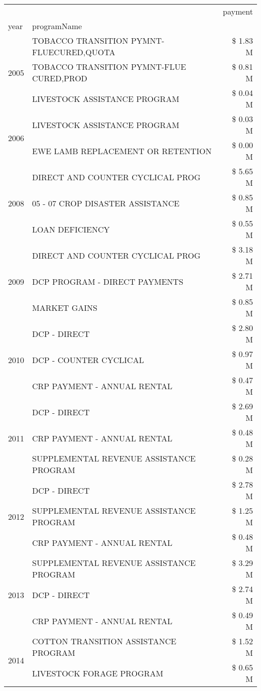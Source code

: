 \begin{tabular}{llr}
\toprule
 &  & payment \\
year & programName &  \\
\midrule
\multirow[t]{3}{*}{2005} & TOBACCO TRANSITION PYMNT-FLUECURED,QUOTA & \$ 1.83 M \\
 & TOBACCO TRANSITION PYMNT-FLUE CURED,PROD & \$ 0.81 M \\
 & LIVESTOCK ASSISTANCE PROGRAM & \$ 0.04 M \\
\cline{1-3}
\multirow[t]{2}{*}{2006} & LIVESTOCK ASSISTANCE PROGRAM & \$ 0.03 M \\
 & EWE LAMB REPLACEMENT OR RETENTION & \$ 0.00 M \\
\cline{1-3}
\multirow[t]{3}{*}{2008} & DIRECT AND COUNTER CYCLICAL PROG & \$ 5.65 M \\
 & 05 - 07 CROP DISASTER ASSISTANCE & \$ 0.85 M \\
 & LOAN DEFICIENCY & \$ 0.55 M \\
\cline{1-3}
\multirow[t]{3}{*}{2009} & DIRECT AND COUNTER CYCLICAL PROG & \$ 3.18 M \\
 & DCP PROGRAM - DIRECT PAYMENTS & \$ 2.71 M \\
 & MARKET GAINS & \$ 0.85 M \\
\cline{1-3}
\multirow[t]{3}{*}{2010} & DCP - DIRECT & \$ 2.80 M \\
 & DCP - COUNTER CYCLICAL & \$ 0.97 M \\
 & CRP PAYMENT - ANNUAL RENTAL & \$ 0.47 M \\
\cline{1-3}
\multirow[t]{3}{*}{2011} & DCP - DIRECT & \$ 2.69 M \\
 & CRP PAYMENT - ANNUAL RENTAL & \$ 0.48 M \\
 & SUPPLEMENTAL REVENUE ASSISTANCE PROGRAM & \$ 0.28 M \\
\cline{1-3}
\multirow[t]{3}{*}{2012} & DCP - DIRECT & \$ 2.78 M \\
 & SUPPLEMENTAL REVENUE ASSISTANCE PROGRAM & \$ 1.25 M \\
 & CRP PAYMENT - ANNUAL RENTAL & \$ 0.48 M \\
\cline{1-3}
\multirow[t]{3}{*}{2013} & SUPPLEMENTAL REVENUE ASSISTANCE PROGRAM & \$ 3.29 M \\
 & DCP - DIRECT & \$ 2.74 M \\
 & CRP PAYMENT - ANNUAL RENTAL & \$ 0.49 M \\
\cline{1-3}
\multirow[t]{3}{*}{2014} & COTTON TRANSITION ASSISTANCE PROGRAM & \$ 1.52 M \\
 & LIVESTOCK FORAGE PROGRAM & \$ 0.65 M \\

\end{tabular}
